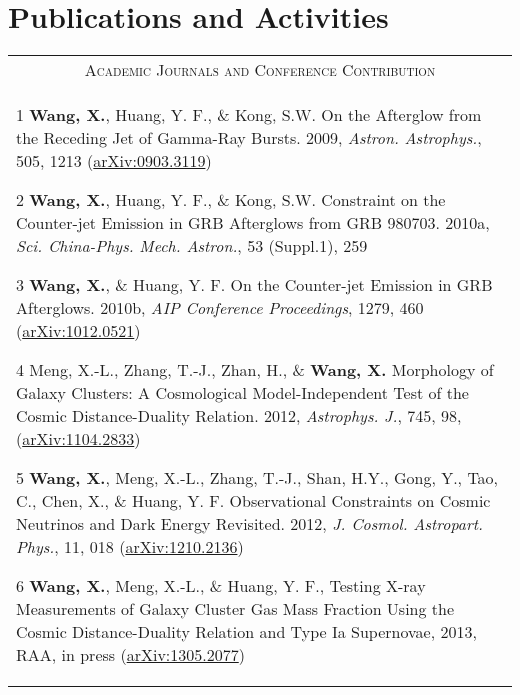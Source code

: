 \documentclass[10pt]{article}
\begin{document}
\section{Publications and Activities}
\begin{longtable}{p{17cm}}
\multicolumn{1}{c}{\textsc{Academic Journals and Conference Contribution}}      \\
\vspace{-0.3cm}
\begin{list}{}{\leftmargin=0.5em}
    \item[1]\hypertarget{1}{} \textbf{Wang, X.}, Huang, Y. F., \& Kong, S.W. On the Afterglow from the Receding Jet of Gamma-Ray Bursts. 2009, \textit{Astron. Astrophys.}, 505, 1213 (\href{http://arxiv.org/abs/0903.3119}{arXiv:0903.3119})
    \item[2]\hypertarget{2}{} \textbf{Wang, X.}, Huang, Y. F., \& Kong, S.W. Constraint on the Counter-jet Emission in GRB Afterglows from GRB 980703. 2010a, \textit{Sci. China-Phys. Mech. Astron.}, 53 (Suppl.1), 259
    \item[3]\hypertarget{3}{} \textbf{Wang, X.}, \& Huang, Y. F. On the Counter-jet Emission in GRB Afterglows. 2010b, \textit{AIP Conference Proceedings}, 1279, 460 (\href{http://arxiv.org/abs/1012.0521}{arXiv:1012.0521})
    \item[4]\hypertarget{4}{} Meng, X.-L., Zhang, T.-J., Zhan, H., \& \textbf{Wang, X.} Morphology of Galaxy Clusters: A Cosmological Model-Independent Test of the Cosmic Distance-Duality Relation. 2012, \textit{Astrophys. J.}, 745, 98, (\href{http://arxiv.org/abs/1104.2833}{arXiv:1104.2833})
    \item[5]\hypertarget{5}{} \textbf{Wang, X.}, Meng, X.-L., Zhang, T.-J., Shan, H.Y., Gong, Y., Tao, C., Chen, X., \& Huang, Y. F. Observational Constraints on Cosmic Neutrinos and Dark Energy Revisited. 2012, \textit{J. Cosmol. Astropart. Phys.}, 11, 018 (\href{http://arxiv.org/abs/1210.2136}{arXiv:1210.2136})
    \item[6]\hypertarget{6}{} \textbf{Wang, X.}, Meng, X.-L., \& Huang, Y. F., Testing X-ray Measurements of Galaxy Cluster Gas Mass Fraction Using the Cosmic Distance-Duality Relation and Type Ia Supernovae, 2013, RAA, in press (\href{http://arxiv.org/abs/1305.2077}{arXiv:1305.2077})
\end{list}  \\
\end{longtable}
\end{document}
